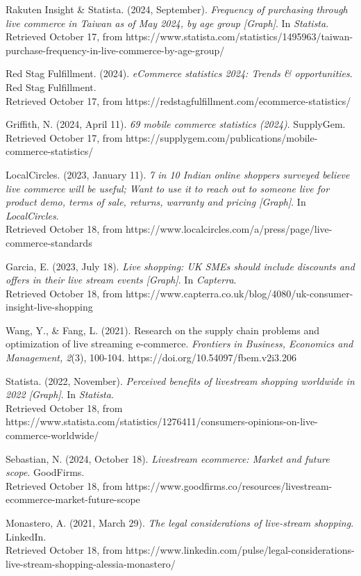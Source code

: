 \documentclass[12pt]{ctexart}
\begin{document}
\begin{thebibliography}{99}
     Rakuten Insight \& Statista. (2024, September). \textit{Frequency of purchasing through live commerce in Taiwan as of May 2024, by age group [Graph]}. In \textit{Statista}. \\ Retrieved October 17, from https://www.statista.com/statistics/1495963/taiwan-purchase-frequency-in-live-commerce-by-age-group/

     Red Stag Fulfillment. (2024). \textit{eCommerce statistics 2024: Trends \& opportunities}. Red Stag Fulfillment.  \\ Retrieved October 17, from https://redstagfulfillment.com/ecommerce-statistics/

     Griffith, N. (2024, April 11). \textit{69 mobile commerce statistics (2024)}. SupplyGem. \\ Retrieved October 17, from https://supplygem.com/publications/mobile-commerce-statistics/
    
     LocalCircles. (2023, January 11). \textit{7 in 10 Indian online shoppers surveyed believe live commerce will be useful; Want to use it to reach out to someone live for product demo, terms of sale, returns, warranty and pricing [Graph]}. In \textit{LocalCircles}.  \\ Retrieved October 18, from https://www.localcircles.com/a/press/page/live-commerce-standards

     Garcia, E. (2023, July 18). \textit{Live shopping: UK SMEs should include discounts and offers in their live stream events [Graph]}. In \textit{Capterra}.  \\ Retrieved October 18, from https://www.capterra.co.uk/blog/4080/uk-consumer-insight-live-shopping

     Wang, Y., \& Fang, L. (2021). Research on the supply chain problems and optimization of live streaming e-commerce. \textit{Frontiers in Business, Economics and Management, 2}(3), 100-104. https://doi.org/10.54097/fbem.v2i3.206

     Statista. (2022, November). \textit{Perceived benefits of livestream shopping worldwide in 2022 [Graph]}. In \textit{Statista}.  \\ Retrieved October 18, from https://www.statista.com/statistics/1276411/consumers-opinions-on-live-commerce-worldwide/

     Sebastian, N. (2024, October 18). \textit{Livestream ecommerce: Market and future scope}. GoodFirms. \\ Retrieved October 18, from https://www.goodfirms.co/resources/livestream-ecommerce-market-future-scope

     Monastero, A. (2021, March 29). \textit{The legal considerations of live-stream shopping}. LinkedIn.  \\ Retrieved October 18, from https://www.linkedin.com/pulse/legal-considerations-live-stream-shopping-alessia-monastero/



    
\end{thebibliography}


\end{document}
